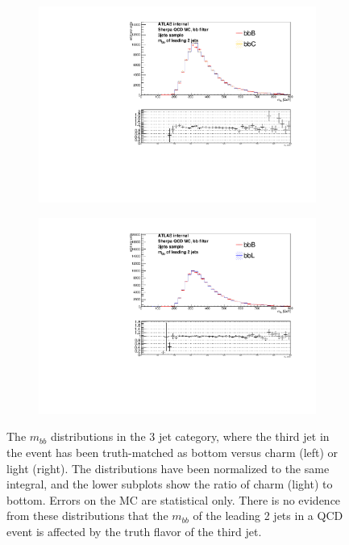 \begin{figure}[phtb!]
  \begin{center}
  \begin{subfigure}[$BBB$ vs $BBC$, 3 jet category]{0.45\textwidth}\includegraphics[width=\textwidth]{MonteCarlo/figures/mbb_bbB_3jets_bbB_bbC.pdf}\end{subfigure}
  \begin{subfigure}[$BBB$ vs $BBL$, 3 jet category]{0.45\textwidth}\includegraphics[width=\textwidth]{MonteCarlo/figures/mbb_bbB_3jets_bbB_bbL.pdf}\end{subfigure}
  \caption{The $m_{bb}$ distributions in the 3 jet category, where the third jet in the event has been 
  truth-matched as bottom versus charm (left) or light (right).  The distributions have been normalized to 
  the same integral, and the lower subplots show the ratio of charm (light) to bottom.  Errors on the MC
  are statistical only.  There is no evidence from these distributions that the $m_{bb}$ of the leading
  2 jets in a QCD event is affected by the truth flavor of the third jet. 
  \label{fig:mbb_bb_qcd_mc}}
    \end{center}
\end{figure}









